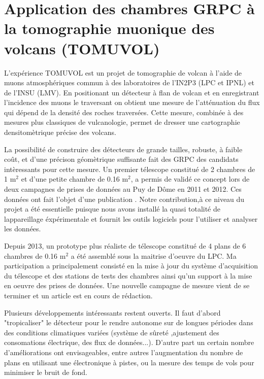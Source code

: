 \documentclass[9pt,french]{article}
\begin{document}
\section*{ Application des chambres GRPC \`a la tomographie muonique des volcans (TOMUVOL)}

L'exp\'erience TOMUVOL est un projet  de tomographie de volcan \`a l'aide de muons atmosph\'eriques commun \`a des laboratoires de l'IN2P3 (LPC et IPNL) et de l'INSU (LMV). En positionant un d\'etecteur \`a flan de volcan et en enregistrant l'incidence des muons le traversant on obtient une mesure de  l'att\'enuation du flux qui d\'epend  de la densit\'e des roches travers\'ees. Cette mesure, combin\'ee \`a des mesures plus classiques de vulcanologie, permet de dresser une cartographie densitom\`etrique pr\'ecise des volcans.

La possibilit\'e de construire des d\'etecteurs de grande tailles, robuste, \`a faible co\^ut, et d'une pr\'ecison g\'eom\`etrique suffisante fait des GRPC des candidats int\`eressants pour cette mesure. Un premier t\'elescope constitu\'e de 2 chambres de 1 m$^2$ et d'une petite chambre de 0.16 m$^2$, a permis de valid\'e ce concept lors de deux campagnes de prises de donn\'ees au Puy de D\^ome en 2011 et 2012. Ces donn\'ees ont fait l'objet d'une publication \cite{gid}.  Notre contribution,\`a ce niveau du projet a \'et\'e essentielle puisque nous avons install\'e la quasi totalit\'e  de lappareillage \'exp\'erimentale et fournit les outils logiciels pour l'utiliser et analyser les donn\'ees.

Depuis 2013, un prototype plus r\'ealiste de t\'elescope constitu\'e de 4 plans de 6 chambres de 0.16 m$^2$ a \'et\'e assembl\'e sous la maitrise d'oeuvre du LPC. Ma participation a principalement consist\'e en la mise \`a jour du syst\`eme d'acquisition du t\'elescope et des stations de tests des chambres ainsi qu'un support \`a la mise en oeuvre des prises de donn\'ees. Une nouvelle campagne de mesure vient de se terminer et un article est en cours de r\'edaction.

Plusieurs d\'eveloppements int\'eressants restent ouverts. Il faut d'abord "tropicaliser" le d\'etecteur pour le rendre autonome sur de longues p\'eriodes dans des conditions climatiques vari\'ees (syst\`eme de s\^uret\'e ,ajustement des consomations \'electrique, des flux de donn\'ees...). D'autre part un certain nombre d'am\'eliorations ont envisageables, entre autres l'augmentation du nombre de plans en utilisant une \'electronique \`a pistes, ou la mesure des temps de vols pour minimiser le bruit de fond.      
\end{document}
